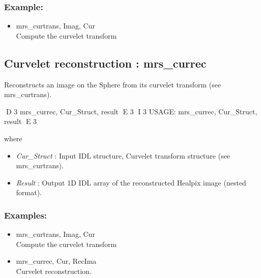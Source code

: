 \subsubsection*{Example:} 
\begin{itemize}
\item mrs\_curtrans, Imag, Cur \\
Compute the curvelet transform
\end{itemize}



\subsection{Curvelet reconstruction : mrs\_currec}
Reconstructs an image on the Sphere from its curvelet transform (see mrs\_curtrans).   
{\bf
\begin{center}
D 3
       mrs\_currec, Cur\_Struct, result  
E 3
I 3
      USAGE: mrs\_currec, Cur\_Struct, result  
E 3
\end{center}}
where
\begin{itemize}
\item {\em Cur\_Struct} : Input IDL structure, Curvelet transform structure (see mrs\_curtrans).
\item {\em Result} : Output 1D IDL array of the reconstructed Healpix image (nested format).
\end{itemize}

\subsubsection*{Examples:} 
\begin{itemize}
\item mrs\_curtrans, Imag, Cur   \\
Compute the curvelet transform
\item mrs\_currec,  Cur, RecIma \\
Curvelet reconstruction.
\end{itemize}



